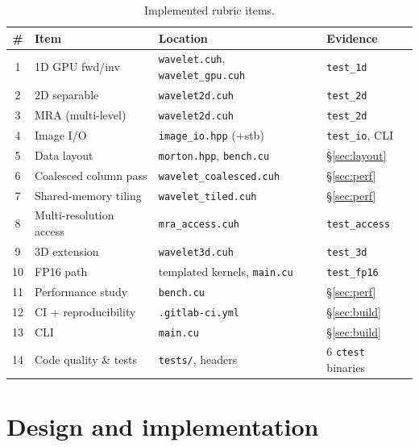 \documentclass[11pt]{article}
\newcommand{\code}[1]{\texttt{#1}}
\begin{document}
\begin{table}[h]
\centering\small
\begin{tabular}{@{}clll@{}}
\toprule
\# & Item & Location & Evidence \\
\midrule
1  & 1D GPU fwd/inv          & \code{wavelet.cuh}, \code{wavelet\_gpu.cuh} & \code{test\_1d} \\
2  & 2D separable            & \code{wavelet2d.cuh}                        & \code{test\_2d} \\
3  & MRA (multi-level)       & \code{wavelet2d.cuh}                        & \code{test\_2d} \\
4  & Image I/O               & \code{image\_io.hpp} (+stb)                 & \code{test\_io}, CLI \\
5  & Data layout             & \code{morton.hpp}, \code{bench.cu}          & \S\ref{sec:layout} \\
6  & Coalesced column pass   & \code{wavelet\_coalesced.cuh}               & \S\ref{sec:perf} \\
7  & Shared-memory tiling    & \code{wavelet\_tiled.cuh}                   & \S\ref{sec:perf} \\
8  & Multi-resolution access & \code{mra\_access.cuh}                      & \code{test\_access} \\
9  & 3D extension            & \code{wavelet3d.cuh}                        & \code{test\_3d} \\
10 & FP16 path               & templated kernels, \code{main.cu}          & \code{test\_fp16} \\
11 & Performance study       & \code{bench.cu}                             & \S\ref{sec:perf} \\
12 & CI + reproducibility    & \code{.gitlab-ci.yml}                       & \S\ref{sec:build} \\
13 & CLI                     & \code{main.cu}                              & \S\ref{sec:build} \\
14 & Code quality \& tests   & \code{tests/}, headers                      & 6 \code{ctest} binaries \\
\bottomrule
\end{tabular}
\caption{Implemented rubric items.}
\label{tab:items}
\end{table}

\section{Design and implementation}
\end{document}
